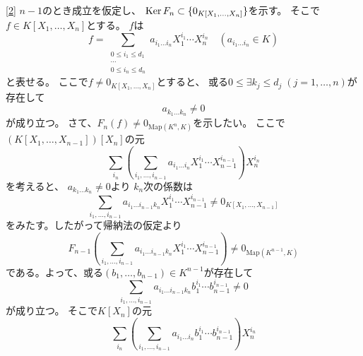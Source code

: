 \documentclass[report]{jlreq}
\begin{document}
\begin{answer}
    \uline{[2]} \quad
    $n - 1$のとき成立を仮定し、
    $\operatorname{\mathrm{Ker}} F_n \subset \{ 0_{K[X_1, \dots, X_n]} \}$を示す。
    そこで$f \in K[X_1, \dots, X_n]$とする。
    $f$は
    \begin{equation}
        f = \sum_{\substack{0 \le i_1 \le d_1 \\ \cdots \\ 0 \le i_n \le d_n}}
            a_{i_1 \dots i_n} X_1^{i_1} \cdots X_n^{i_n}
            \quad (a_{i_1 \dots i_n} \in K)
    \end{equation}
    と表せる。
    ここで$f \neq 0_{K[X_1, \dots, X_n]}$とすると、
    或る$0 \le \exists k_j \le d_j \; (j = 1, \dots, n)$が存在して
    \begin{equation}
        a_{k_1 \dots k_n} \neq 0
    \end{equation}
    が成り立つ。
    さて、$F_n(f) \neq 0_{\mathrm{Map}(K^n, K)}$を示したい。
    ここで$(K[X_1, \dots, X_{n - 1}])[X_n]$の元
    \begin{equation}
        \sum_{i_n} \left(
            \sum_{i_1, \dots, i_{n - 1}}
                a_{i_1 \dots i_n} X_1^{i_1} \cdots X_{n - 1}^{i_{n - 1}}
        \right) X_n^{i_n}
    \end{equation}
    を考えると、
    $a_{k_1 \dots k_n} \neq 0$より
    $k_n$次の係数は
    \begin{equation}
        \sum_{i_1, \dots, i_{n - 1}}
            a_{i_1 \dots i_{n - 1} k_n} X_1^{i_1} \cdots X_{n - 1}^{i_{n - 1}}
            \neq 0_{K[X_1, \dots, X_{n - 1}]}
    \end{equation}
    をみたす。したがって帰納法の仮定より
    \begin{equation}
        F_{n - 1} \left(
            \sum_{i_1, \dots, i_{n - 1}}
            a_{i_1 \dots i_{n - 1} k_n} X_1^{i_1} \cdots X_{n - 1}^{i_{n - 1}}
        \right) \neq 0_{\mathrm{Map}(K^{n - 1}, K)}
    \end{equation}
    である。よって、或る$(b_1, \dots, b_{n - 1}) \in K^{n - 1}$が存在して
    \begin{equation}
        \sum_{i_1, \dots, i_{n - 1}}
            a_{i_1 \dots i_{n - 1} k_n} b_1^{i_1} \cdots b_{n - 1}^{i_{n - 1}}
            \neq 0
    \end{equation}
    が成り立つ。
    そこで$K[X_n]$の元
    \begin{equation}
        \sum_{i_n} \left(
            \sum_{i_1, \dots, i_{n - 1}}
                a_{i_1 \dots i_n} b_1^{i_1} \cdots b_{n - 1}^{i_{n - 1}}
        \right) X_n^{i_n}
    \end{equation}

\end{answer}
\end{document}
